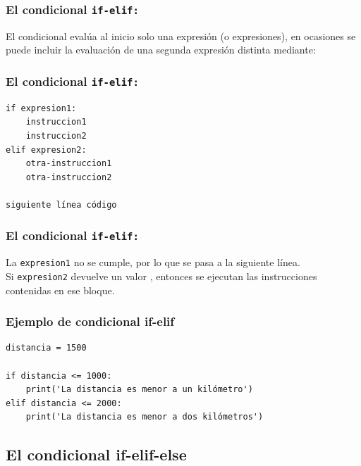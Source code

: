 \documentclass[12pt]{beamer}
\begin{document}
\begin{frame}[fragile]
\frametitle{El condicional \texttt{if-elif:}}
El condicional  evalúa al inicio solo una expresión (o expresiones), \pause en ocasiones se puede incluir la evaluación de una segunda expresión distinta mediante:
\end{frame}
\begin{frame}[fragile]
\frametitle{El condicional \texttt{if-elif:}}
\begin{verbatim}
if expresion1:
    instruccion1
    instruccion2
elif expresion2:
    otra-instruccion1
    otra-instruccion2

siguiente línea código
\end{verbatim}
\end{frame}
\begin{frame}
\frametitle{El condicional \texttt{if-elif:}}
La \texttt{expresion1} no se cumple, por lo que se pasa a la siguiente línea.
\\
\bigskip
\pause
Si \texttt{expresion2} devuelve un valor , entonces se ejecutan las instrucciones contenidas en ese bloque.
\end{frame}
\begin{frame}[fragile]
\frametitle{Ejemplo de condicional if-elif}
\begin{lstlisting}[caption=La estructura condicional if-elif]
distancia = 1500

if distancia <= 1000:
    print('La distancia es menor a un kilómetro')
elif distancia <= 2000:
    print('La distancia es menor a dos kilómetros')
\end{lstlisting}
\end{frame}    

\subsection{El condicional if-elif-else}
\end{document}
